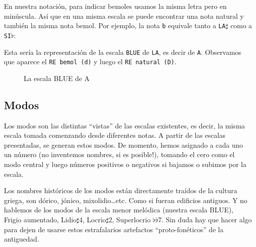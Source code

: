 \documentclass[]{article}
\begin{document}
En nuestra notación, para indicar bemoles usamos la misma letra pero en minúscula. Así que en una misma escala se puede encontrar una nota natural y también la misma nota bemol. Por ejemplo, la nota \texttt{b} equivale tanto a \texttt{LA$\sharp$} como a \texttt{SI$\flat$}: 

Esta sería la representación de la escala \texttt{BLUE} de \texttt{LA}, es decir de \texttt{A}. Observamos que aparece el \texttt{RE\ bemol\ (d)} y luego el \texttt{RE\ natural\ (D)}.
\begin{figure}[h]
 \centering
  \vspace{12pt}
  \caption{La escala BLUE de A}\label{fig:blue-scale-of-a}
\end{figure}

\subsection{Modos}
Los modos son las distintas ``vistas'' de las escalas existentes, es decir, la misma escala tomada comenzando desde diferentes notas.
A partir de las escalas presentadas, se generan estos modos. De momento, hemos asignado a cada uno un número (no inventemos nombres, si es posible!), tomando el cero como el modo central y luego números positivos o negativos si bajamos o subimos por la escala. 

Los nombres históricos de los modos están directamente traídos de la cultura griega, son \textsf{dórico}, \textsf{jónico}, \textsf{mixolidio}\ldots etc. Como si fueran edificios antiguos. Y no hablemos de los modos de la escala menor melódica (nuestra escala \textsf{BLUE}), \textsf{Frigio aumentado}, \textsf{Lidio$\sharp$4}, \textsf{Locrio$\sharp$2}, \textsf{Superlocrio $\flat$$\flat$7}. Sin duda hay que hacer algo para dejen de usarse estos estrafalarios artefactos ``proto-fonéticos'' de la antiguedad.
\end{document}
